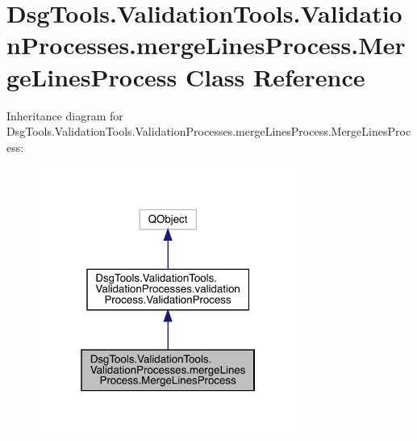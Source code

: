 \hypertarget{class_dsg_tools_1_1_validation_tools_1_1_validation_processes_1_1merge_lines_process_1_1_merge_lines_process}{}\section{Dsg\+Tools.\+Validation\+Tools.\+Validation\+Processes.\+merge\+Lines\+Process.\+Merge\+Lines\+Process Class Reference}
\label{class_dsg_tools_1_1_validation_tools_1_1_validation_processes_1_1merge_lines_process_1_1_merge_lines_process}


Inheritance diagram for Dsg\+Tools.\+Validation\+Tools.\+Validation\+Processes.\+merge\+Lines\+Process.\+Merge\+Lines\+Process\+:
\nopagebreak
\begin{figure}[H]
\begin{center}
\leavevmode
\includegraphics[width=241pt]{class_dsg_tools_1_1_validation_tools_1_1_validation_processes_1_1merge_lines_process_1_1_merge_lines_process__inherit__graph}
\end{center}
\end{figure}


